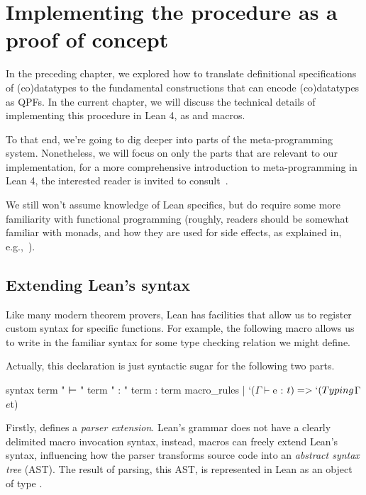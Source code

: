 \chapter{Implementing the procedure as a proof of concept}%
\label{ch:implementing}


In the preceding chapter, we explored how to translate definitional specifications of (co)datatypes to the fundamental constructions that can encode (co)datatypes as QPFs.
In the current chapter, we will discuss the technical details of implementing this procedure in Lean 4, as \data{}
and \codata{} macros.

To that end, we're going to dig deeper into parts of the meta-programming system. Nonetheless, we
will focus on only the parts that are relevant to our implementation, for a more comprehensive introduction
to meta-programming in Lean 4, the interested reader is invited to consult~\cite{paulinoMetaprogrammingLean, ullrichNotationsHygienicMacro2022}.


We still won't assume knowledge of Lean specifics, but do require some more familiarity with functional programming (roughly, readers should be somewhat familiar with monads, and how they are used for side effects, as explained in, e.g.,~\cite{christiansenFunctionalProgrammingLean}).


\section{Extending Lean's syntax}%
\label{sec:syntax}

Like many modern theorem provers, Lean has facilities that allow us to register custom syntax for specific functions. For example, the following macro allows us to write  in the familiar syntax for some type checking relation  we might define.
Actually, this  declaration is just syntactic sugar for the following two parts.

\begin{leancode}
  syntax term " ⊢ " term " : " term : term
  macro_rules
    | `($Γ ⊢ $e : $t) => `(Typing $Γ $e $t)
\end{leancode}

Firstly,  defines a \emph{parser extension}.
Lean's grammar does not have a clearly delimited macro invocation syntax, instead,
macros can freely extend Lean's syntax, influencing how the parser transforms source code into an \emph{abstract syntax tree} (AST).
The result of parsing, this AST, is represented in Lean as an object of type .

